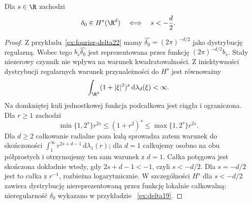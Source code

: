 \begin{wniosek}
\label{cor:dt-delta-Hs}
Dla $s\in\R$ zachodzi
\[
 \delta_0\in H^s(\R^d)\quad\Longleftrightarrow\quad
 s<-\frac d2.
\]
\end{wniosek}
\begin{proof}
Z przykładu~\ref{ex:fourier-delta22} mamy
$\widehat{\delta_0}=(2\pi)^{-d/2}$ jako dystrybucję regularną.
Wobec tego $b_s\widehat{\delta_0}$ jest
reprezentowana przez funkcję $(2\pi)^{-d/2}b_s$.
Stały niezerowy czynnik nie wpływa na warunek
kwadratowalności.
Z iniektywności dystrybucji regularnych
warunek przynależności do $H^s$ jest równoważny
\[
 \int_{\R^d}(1+|\xi|^2)^s\,
 \mathrm d\lambda_d(\xi)<\infty.
\]
Na domkniętej kuli jednostkowej funkcja podcałkowa
jest ciągła i ograniczona. Dla $r\ge1$ zachodzi
\[
 \min\{1,2^s\}r^{2s}\le(1+r^2)^s
 \le\max\{1,2^s\}r^{2s}.
\]
Dla $d\ge2$ całkowanie radialne poza kulą
sprowadza zatem warunek do skończoności
$\int_1^\infty r^{2s+d-1}\,\mathrm d\lambda_1(r)$;
dla $d=1$ całkujemy osobno na obu półprostych
i otrzymujemy ten sam warunek z $d=1$.
Całka potęgowa jest skończona dokładnie wtedy,
gdy $2s+d-1<-1$, czyli $s<-d/2$.
Dla $s=-d/2$ jest to całka z $r^{-1}$,
rozbieżna logarytmicznie. W szczególności
$H^s$ dla $s<-d/2$ zawiera dystrybucję
niereprezentowaną przez funkcję lokalnie całkowalną:
nieregularność $\delta_0$ wykazano w przykładzie
~\ref{ex:delta19}.
\end{proof}
